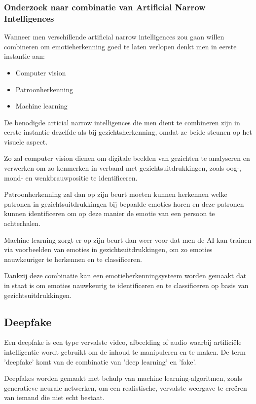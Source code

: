 \subsubsection{Onderzoek naar combinatie van Artificial Narrow Intelligences}

Wanneer men verschillende artificial narrow intelligences zou gaan willen combineren om emotieherkenning goed te laten verlopen denkt men in eerste instantie aan:

\begin{itemize}
    \item Computer vision
    \item Patroonherkenning
    \item Machine learning
\end{itemize}

De benodigde articial narrow intelligences die men dient te combineren zijn in eerste instantie dezelfde als bij gezichtsherkenning, omdat ze beide steunen op het visuele aspect.

Zo zal computer vision dienen om digitale beelden van gezichten te analyseren en verwerken om zo kenmerken in verband met gezichtsuitdrukkingen, zoals oog-, mond- en wenkbrauwpositie te identificeren.

Patroonherkenning zal dan op zijn beurt moeten kunnen herkennen welke patronen in gezichtsuitdrukkingen bij bepaalde emoties horen en deze patronen kunnen identificeren om op deze manier de emotie van een persoon te achterhalen.

Machine learning zorgt er op zijn beurt dan weer voor dat men de AI kan trainen via voorbeelden van emoties in gezichtsuitdrukkingen, om zo emoties nauwkeuriger te herkennen en te classificeren.

Dankzij deze combinatie kan een emotieherkenningsysteem worden gemaakt dat in staat is om emoties nauwkeurig te identificeren en te classificeren op basis van gezichtsuitdrukkingen.

\subsection{Deepfake}

Een deepfake is een type vervalste video, afbeelding of audio waarbij artificiële intelligentie wordt gebruikt om de inhoud te manipuleren en te maken. De term 'deepfake' komt van de combinatie van 'deep learning' en 'fake'.

Deepfakes worden gemaakt met behulp van machine learning-algoritmen, zoals generatieve neurale netwerken, om een ​​realistische, vervalste weergave te creëren van iemand die niet echt bestaat.

